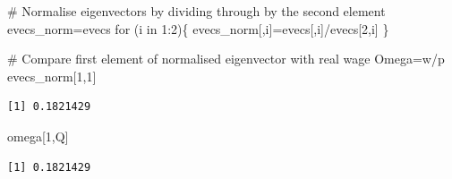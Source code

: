 \documentclass[
  letterpaper,
  DIV=11,
  numbers=noendperiod]{scrreprt}
\newenvironment{Shaded}{\begin{snugshade}}{\end{snugshade}}
\newcommand{\CommentTok}[1]{\textcolor[rgb]{0.37,0.37,0.37}{#1}}
\newcommand{\ControlFlowTok}[1]{\textcolor[rgb]{0.00,0.23,0.31}{#1}}
\newcommand{\DecValTok}[1]{\textcolor[rgb]{0.68,0.00,0.00}{#1}}
\newcommand{\NormalTok}[1]{\textcolor[rgb]{0.00,0.23,0.31}{#1}}
\newcommand{\OtherTok}[1]{\textcolor[rgb]{0.00,0.23,0.31}{#1}}
\newcommand{\SpecialCharTok}[1]{\textcolor[rgb]{0.37,0.37,0.37}{#1}}
\begin{document}
\begin{Shaded}
\begin{Highlighting}[]
\CommentTok{\# Normalise eigenvectors by dividing through by the second element}
\NormalTok{evecs\_norm}\OtherTok{=}\NormalTok{evecs}
\ControlFlowTok{for}\NormalTok{ (i }\ControlFlowTok{in} \DecValTok{1}\SpecialCharTok{:}\DecValTok{2}\NormalTok{)\{}
\NormalTok{  evecs\_norm[,i]}\OtherTok{=}\NormalTok{evecs[,i]}\SpecialCharTok{/}\NormalTok{evecs[}\DecValTok{2}\NormalTok{,i]}
\NormalTok{\}}

\CommentTok{\# Compare first element of normalised eigenvector with real wage Omega=w/p}
\NormalTok{evecs\_norm[}\DecValTok{1}\NormalTok{,}\DecValTok{1}\NormalTok{]}
\end{Highlighting}
\end{Shaded}

\begin{verbatim}
[1] 0.1821429
\end{verbatim}

\begin{Shaded}
\begin{Highlighting}[]
\NormalTok{omega[}\DecValTok{1}\NormalTok{,Q] }
\end{Highlighting}
\end{Shaded}

\begin{verbatim}
[1] 0.1821429
\end{verbatim}
\end{document}
